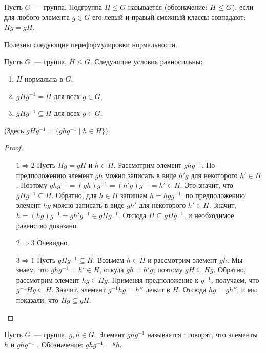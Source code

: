 \begin{definition}
Пусть $G$~--- группа. Подгруппа $H\leq G$ называется
 (обозначение: $H\trianglelefteq
G$), если для любого элемента $g\in G$ его левый и правый смежный
классы совпадают: $Hg = gH$.
\end{definition}

Полезны следующие переформулировки нормальности.

\begin{lemma}\label{lem:normal_subgroup}
Пусть $G$~--- группа, $H\leq G$. Следующие условия
равносильны: 
\begin{enumerate}
\item $H$ нормальна в $G$;
\item $gHg^{-1} = H$ для всех $g\in G$;
\item $gHg^{-1}\subseteq H$ для всех $g\in G$.
\end{enumerate}
(Здесь $gHg^{-1} = \{ghg^{-1}\mid h\in H\}$).
\end{lemma}
\begin{proof}
\begin{itemize}
\item[$1\Rightarrow 2$] Пусть $Hg = gH$ и $h\in H$.
Рассмотрим элемент $ghg^{-1}$. По предположению элемент
$gh$ можно записать в виде $h'g$ для некоторого $h'\in H$.
Поэтому $ghg^{-1} = (gh)g^{-1} = (h'g)g^{-1} = h'\in H$.
Это значит, что $gHg^{-1}\subseteq H$.
Обратно, для $h\in H$ запишем $h = hgg^{-1}$; по предположению элемент
$hg$ можно записать в виде $gh'$ для некоторого $h'\in H$. Значит,
$h = (hg)g^{-1} = gh'g^{-1}\in gHg^{-1}$. Отсюда $H\subseteq
gHg^{-1}$, и необходимое равенство доказано.
\item[$2\Rightarrow 3$] Очевидно.
\item[$3\Rightarrow 1$] Пусть $gHg^{-1}\subseteq H$. Возьмем $h\in H$
  и рассмотрим элемент $gh$. Мы знаем, что $ghg^{-1} = h'\in H$, откуда
  $gh = h'g$; поэтому $gH\subseteq Hg$. Обратно,
  рассмотрим элемент $hg\in Hg$. Применяя предположение к $g^{-1}$,
  получаем, что $g^{-1}Hg\subseteq H$. Значит, элемент $g^{-1}hg=h''$
  лежит в $H$. Отсюда $hg = gh''$, и мы показали, что $Hg\subseteq gH$.
\end{itemize}
\end{proof}

\begin{definition}
Пусть $G$~--- группа, $g,h\in G$. Элемент $ghg^{-1}$ называется
; говорят, что элементы $h$ и
$ghg^{-1}$ . Обозначение:
$ghg^{-1} = {}^gh$.
\end{definition}

